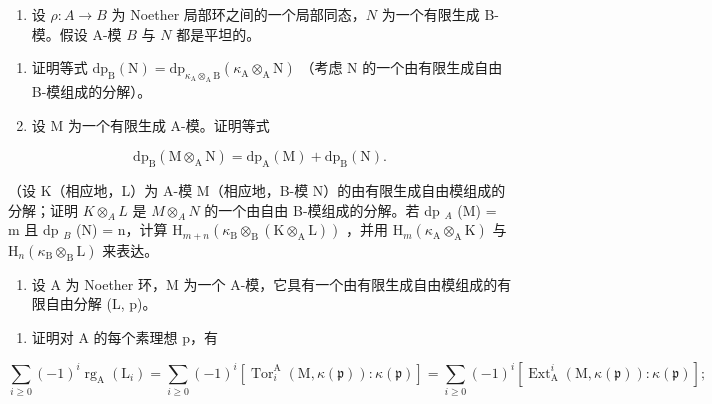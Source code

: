 
\begin{enumerate}
\def\labelenumi{\arabic{enumi})}
\tightlist
\item
  设 \(\rho: A \to B\) 为 Noether 局部环之间的一个局部同态，\(N\) 为一个有限生成 B-模。假设 A-模 \(B\) 与 \(N\) 都是平坦的。
\end{enumerate}

\begin{enumerate}
\def\labelenumi{\alph{enumi})}
\item
  证明等式 \(\mathrm{dp}_{\mathrm{B}}(\mathrm{N}) = \mathrm{dp}_{\kappa_{\mathrm{A}} \otimes_{\mathrm{A}} \mathrm{B}}(\kappa_{\mathrm{A}} \otimes_{\mathrm{A}} \mathrm{N})\) （考虑 N 的一个由有限生成自由 B-模组成的分解）。
\item
  设 M 为一个有限生成 A-模。证明等式
\end{enumerate}

\[
\mathrm{dp} _ {\mathrm{B}} (\mathrm{M} \otimes_ {\mathrm{A}} \mathrm{N}) = \mathrm{dp} _ {\mathrm{A}} (\mathrm{M}) + \mathrm{dp} _ {\mathrm{B}} (\mathrm{N}).
\]

（设 K（相应地，L）为 A-模 M（相应地，B-模 N）的由有限生成自由模组成的分解；证明 \(K \otimes_{A} L\) 是 \(M \otimes_{A} N\) 的一个由自由 B-模组成的分解。若 dp \(_{A}\) (M) = m 且 dp \(_{B}\) (N) = n，计算 \(\mathrm{H}_{m+n}(\kappa_{\mathrm{B}} \otimes_{\mathrm{B}} (\mathrm{K} \otimes_{\mathrm{A}} \mathrm{L}))\) ，并用 \(\mathrm{H}_{m}(\kappa_{\mathrm{A}} \otimes_{\mathrm{A}} \mathrm{K})\) 与 \(\mathrm{H}_{n}(\kappa_{\mathrm{B}} \otimes_{\mathrm{B}} \mathrm{L})\) 来表达。

\begin{enumerate}
\def\labelenumi{\arabic{enumi})}
\setcounter{enumi}{1}
\tightlist
\item
  设 A 为 Noether 环，M 为一个 A-模，它具有一个由有限生成自由模组成的有限自由分解 (L, p)。
\end{enumerate}

\begin{enumerate}
\def\labelenumi{\alph{enumi})}
\tightlist
\item
  证明对 A 的每个素理想 p，有
\end{enumerate}

\[
\sum_ {i \geqslant 0} (- 1) ^ {i} \operatorname{rg} _ {\mathrm{A}} (\mathrm{L} _ {i}) = \sum_ {i \geqslant 0} (- 1) ^ {i} \left[ \operatorname{Tor} _ {i} ^ {\mathrm{A}} (\mathrm{M}, \kappa (\mathfrak {p})): \kappa (\mathfrak {p}) \right] = \sum_ {i \geqslant 0} (- 1) ^ {i} \left[ \operatorname{Ext} _ {\mathrm{A}} ^ {i} (\mathrm{M}, \kappa (\mathfrak {p})): \kappa (\mathfrak {p}) \right];
\]

